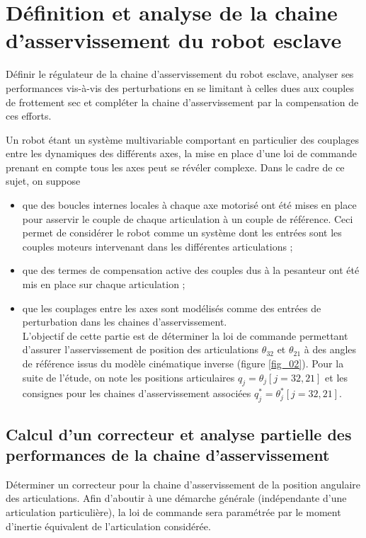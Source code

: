 
\section{Définition et analyse de la chaine d'asservissement du robot esclave}
\begin{obj}
Définir le régulateur de la chaine d'asservissement du robot esclave, analyser ses performances vis-à-vis des perturbations en se limitant à celles dues aux couples de frottement sec et compléter la chaine d'asservissement par la compensation de ces efforts.
\end{obj}
\ifprof
\else
Un robot étant un système multivariable comportant en particulier des couplages entre les dynamiques des différents axes, la mise en place d'une loi de commande prenant en compte tous les axes peut se révéler complexe. Dans le cadre de ce sujet, on suppose

\begin{itemize}
  \item que des boucles internes locales à chaque axe motorisé ont été mises en place pour asservir le couple de chaque articulation à un couple de référence. Ceci permet de considérer le robot comme un système dont les entrées sont les couples moteurs intervenant dans les différentes articulations ;
  \item que des termes de compensation active des couples dus à la pesanteur ont été mis en place sur chaque articulation ;
  \item que les couplages entre les axes sont modélisés comme des entrées de perturbation dans les chaines d'asservissement.\\
L'objectif de cette partie est de déterminer la loi de commande permettant d'assurer l'asservissement de position des articulations $\theta_{32}$ et $\theta_{21}$ à des angles de référence issus du modèle cinématique inverse (figure \ref{fig_02}). Pour la suite de l'étude, on note les positions articulaires $q_{j}=\theta_{j}[j=32,21]$ et les consignes pour les chaines d'asservissement associées $q_{j}^{*}=\theta_{j}^{*}[j=32,21]$.
\end{itemize}
\fi

\subsection{Calcul d'un correcteur et analyse partielle des performances de la chaine d'asservissement}
\begin{obj}
Déterminer un correcteur pour la chaine d'asservissement de la position angulaire des articulations. Afin d'aboutir à une démarche générale (indépendante d'une articulation particulière), la loi de commande sera paramétrée par le moment d'inertie équivalent de l'articulation considérée.
\end{obj}

